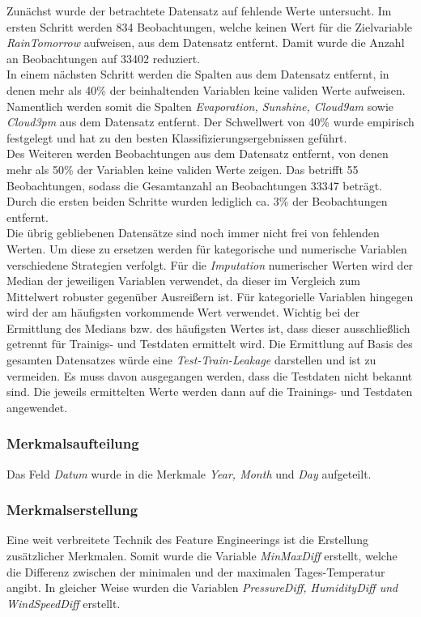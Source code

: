 Zunächst wurde der betrachtete Datensatz auf fehlende Werte untersucht. Im ersten Schritt werden 834 Beobachtungen, welche keinen Wert für die Zielvariable \emph{RainTomorrow} aufweisen, aus dem Datensatz entfernt. Damit wurde die Anzahl an Beobachtungen auf 33402 reduziert.\\
\noindent \hspace*{7mm}
In einem nächsten Schritt werden die Spalten aus dem Datensatz entfernt, in denen mehr als 40\% der beinhaltenden Variablen keine validen Werte aufweisen. Namentlich werden somit die Spalten \emph{Evaporation, Sunshine, Cloud9am} sowie \emph{Cloud3pm} aus dem Datensatz entfernt. Der Schwellwert von 40\% wurde empirisch festgelegt und hat zu den besten Klassifizierungsergebnissen geführt.\\
\noindent \hspace*{7mm}
Des Weiteren werden Beobachtungen aus dem Datensatz entfernt, von denen mehr als 50\% der Variablen keine validen Werte zeigen. Das betrifft 55 Beobachtungen, sodass die Gesamtanzahl an Beobachtungen 33347 beträgt. Durch die ersten beiden Schritte wurden lediglich ca. 3\% der Beobachtungen entfernt.\\
\noindent \hspace*{7mm}
Die übrig gebliebenen Datensätze sind noch immer nicht frei von fehlenden Werten. Um diese zu ersetzen werden für kategorische und numerische Variablen verschiedene Strategien verfolgt. Für die \emph{Imputation} numerischer Werten wird der Median der jeweiligen Variablen verwendet, da dieser im Vergleich zum Mittelwert robuster gegenüber Ausreißern ist. Für kategorielle Variablen hingegen wird der am häufigsten vorkommende Wert verwendet. Wichtig bei der Ermittlung des Medians bzw. des häufigsten Wertes ist, dass dieser ausschließlich getrennt für Trainigs- und Testdaten ermittelt wird. Die Ermittlung auf Basis des gesamten Datensatzes würde eine \emph{Test-Train-Leakage} darstellen und ist zu vermeiden. Es muss davon ausgegangen werden, dass die Testdaten nicht bekannt sind. Die jeweils ermittelten Werte werden dann auf die Trainings- und Testdaten angewendet.

\subsubsection{Merkmalsaufteilung}
Das Feld \emph{Datum} wurde in die Merkmale \emph{Year, Month} und \emph{Day} aufgeteilt.

\subsubsection{Merkmalserstellung}
Eine weit verbreitete Technik des Feature Engineerings ist die Erstellung zusätzlicher Merkmalen. Somit wurde die Variable \emph{MinMaxDiff} erstellt, welche die Differenz zwischen der minimalen und der maximalen Tages-Temperatur angibt. In gleicher Weise wurden die Variablen \emph{PressureDiff, HumidityDiff und WindSpeedDiff} erstellt.

